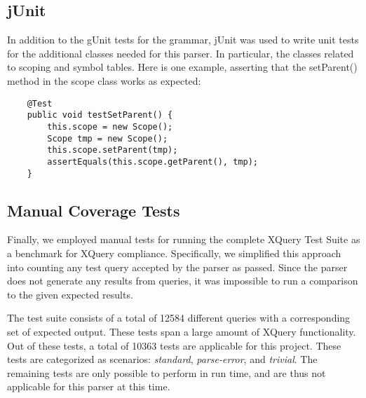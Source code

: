 \subsection{jUnit}
In addition to the gUnit tests for the grammar, jUnit was used to write unit tests for
the additional classes needed for this parser. In particular, the classes
related to scoping and symbol tables. Here is one example, asserting that the
setParent() method in the scope class works as expected:
\begin{Verbatim}
    @Test
    public void testSetParent() {
        this.scope = new Scope();
        Scope tmp = new Scope();
        this.scope.setParent(tmp);
        assertEquals(this.scope.getParent(), tmp);
    }
\end{Verbatim}

\subsection{Manual Coverage Tests}
Finally, we employed manual tests for running the complete XQuery Test Suite\cite{w3c05}
as a benchmark for XQuery compliance. Specifically, we simplified this approach
into counting any test query accepted by the parser as passed. Since the parser
does not generate any results from queries, it was impossible to run a
comparison to the given expected results.

The test suite consists of a total of 12584 different queries with a
corresponding set of expected output. These tests span a large amount of XQuery
functionality. Out of these tests, a total of 10363 tests are applicable for
this project. These tests are categorized as scenarios: \emph{standard}, 
\emph{parse-error}, and \emph{trivial}. The remaining tests are only possible to
perform in run time, and are thus not applicable for this parser at this time.